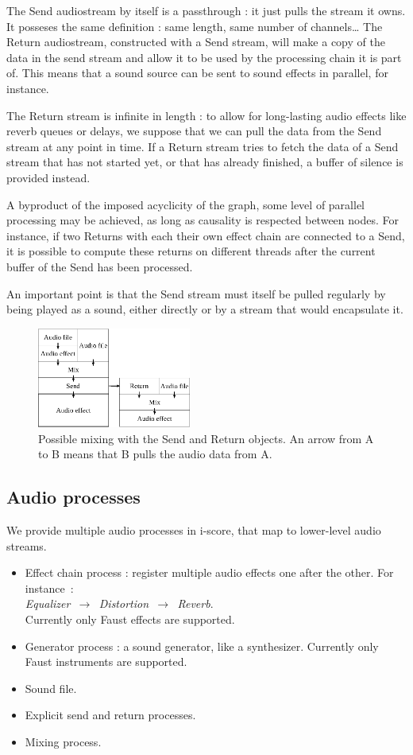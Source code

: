 \documentclass{article}
\begin{document}
The Send audiostream by itself is a passthrough : it just pulls the stream it owns.
It posseses the same definition : same length, same number of channels\dots
The Return audiostream, constructed with a Send stream, will make a copy of the data in 
the send stream and allow it to be used by the processing chain it is part of.
This means that a sound source can be sent to sound effects in parallel, for instance.

The Return stream is infinite in length : to allow for long-lasting audio effects 
like reverb queues or delays, we suppose that we can pull the data from the Send stream at any point in time.
If a Return stream tries to fetch the data of a Send stream that has not started yet, or that has already finished, a buffer of silence is provided instead.

A byproduct of the imposed acyclicity of the graph, some level of parallel processing may be achieved, as long as causality is respected between nodes. 
For instance, if two Returns with each their own effect chain are connected to a Send, it is possible to compute these returns on different threads after the current buffer of the Send has been processed.

An important point is that the Send stream must itself be pulled regularly by being played as a sound, either directly or by a stream that would encapsulate it.

\begin{figure}
	\centering
	\includegraphics[width=0.45\textwidth]{figures/graph2.eps}
	\caption{Possible mixing with the Send and Return objects. An arrow from A to B means that B pulls the audio data from A.}
	\label{fig.mixsendreturn}
\end{figure}

\subsection{Audio processes}
We provide multiple audio processes in i-score, that map 
to lower-level audio streams.

\begin{itemize}
	\item Effect chain process : register multiple audio effects one after the other. 
	For instance~:~\\ \emph{ Equalizer $\,\to\,$ Distortion $\,\to\,$ Reverb}. ~\\
	Currently only Faust effects are supported.
	\item Generator process : a sound generator, like a synthesizer. 
	Currently only Faust instruments are supported.
	\item Sound file.
	\item Explicit send and return processes.
	\item Mixing process.
\end{itemize}
\end{document}
